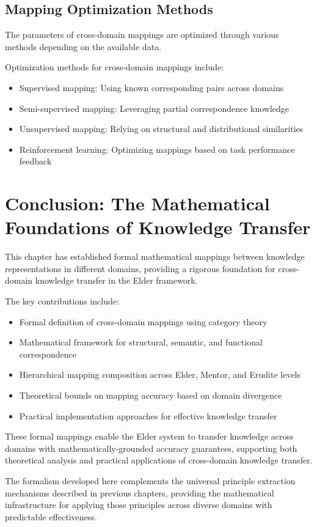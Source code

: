 \subsection{Mapping Optimization Methods}

The parameters of cross-domain mappings are optimized through various methods depending on the available data.

\begin{definition}
Optimization methods for cross-domain mappings include:
\begin{itemize}
    \item Supervised mapping: Using known corresponding pairs across domains
    \item Semi-supervised mapping: Leveraging partial correspondence knowledge
    \item Unsupervised mapping: Relying on structural and distributional similarities
    \item Reinforcement learning: Optimizing mappings based on task performance feedback
\end{itemize}
\end{definition}

\section{Conclusion: The Mathematical Foundations of Knowledge Transfer}

This chapter has established formal mathematical mappings between knowledge representations in different domains, providing a rigorous foundation for cross-domain knowledge transfer in the Elder framework.

The key contributions include:
\begin{itemize}
    \item Formal definition of cross-domain mappings using category theory
    \item Mathematical framework for structural, semantic, and functional correspondence
    \item Hierarchical mapping composition across Elder, Mentor, and Erudite levels
    \item Theoretical bounds on mapping accuracy based on domain divergence
    \item Practical implementation approaches for effective knowledge transfer
\end{itemize}

These formal mappings enable the Elder system to transfer knowledge across domains with mathematically-grounded accuracy guarantees, supporting both theoretical analysis and practical applications of cross-domain knowledge transfer.

The formalism developed here complements the universal principle extraction mechanisms described in previous chapters, providing the mathematical infrastructure for applying those principles across diverse domains with predictable effectiveness.
